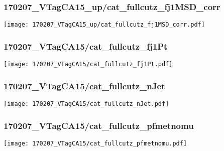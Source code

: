 \begin{frame}
   \frametitle{\small 170207\_VTagCA15\_up/cat\_fullcutz\_fj1MSD\_corr}
   \centering
   \texttt{[image: 170207\_VTagCA15\_up/cat\_fullcutz\_fj1MSD\_corr.pdf]}
\end{frame}

\begin{frame}
   \frametitle{\small 170207\_VTagCA15/cat\_fullcutz\_fj1Pt}
   \centering
   \texttt{[image: 170207\_VTagCA15/cat\_fullcutz\_fj1Pt.pdf]}
\end{frame}

\begin{frame}
   \frametitle{\small 170207\_VTagCA15/cat\_fullcutz\_nJet}
   \centering
   \texttt{[image: 170207\_VTagCA15/cat\_fullcutz\_nJet.pdf]}
\end{frame}

\begin{frame}
   \frametitle{\small 170207\_VTagCA15/cat\_fullcutz\_pfmetnomu}
   \centering
   \texttt{[image: 170207\_VTagCA15/cat\_fullcutz\_pfmetnomu.pdf]}
\end{frame}

